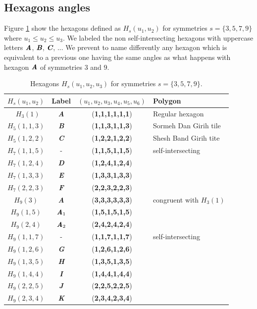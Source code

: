 \documentclass[11pt]{article}
\def\mathbi#1{\textbf{\em #1}}
\begin{document}
\subsection{Hexagons angles}

Figure \ref{tbl:hexagons-angles} show the hexagons defined as $H_s(u_1,u_2)$ for symmetries $s = \{3,5,7,9\}$ where $u_1 \leq u_2 \leq u_3$. We labeled the non self-intersecting hexagons with uppercase letters $\mathbi{A}$, $\mathbi{B}$, $\mathbi{C}$, ... We prevent to name differently any hexagon which is equivalent to a previous one having the same angles as what happens with hexagon $\mathbi{A}$ of symmetries $3$ and $9$.

\begin{table}[H]
\begin{center}
\begin{tabular}{| c | c | c | l | }
\hline
$H_s(u_1,u_2)$ & Label & $(u_1,u_2,u_3,u_4,u_5,u_6)$ & Polygon \\ \hline\
$H_3(1)$   & \mathbi{A} & (\textbf{1,1,1,1,1,1}) & Regular hexagon \\[0.5ex]
\hline
$H_5(1,1,3)$ & \mathbi{B} & (\textbf{1,1,3,1,1,3}) & Sormeh Dan Girih tile\\[0.5ex]
$H_5(1,2,2)$ & \mathbi{C} & (\textbf{1,2,2,1,2,2}) & Shesh Band Girih tite\\[0.5ex]
\hline
$H_7(1,1,5)$ & -          & (\textbf{1,1,5,1,1,5}) & self-intersecting \\[0.5ex]
$H_7(1,2,4)$ & \mathbi{D} & (\textbf{1,2,4,1,2,4}) & \\[0.5ex]
$H_7(1,3,3)$ & \mathbi{E} & (\textbf{1,3,3,1,3,3}) & \\[0.5ex]
$H_7(2,2,3)$ & \mathbi{F} & (\textbf{2,2,3,2,2,3}) & \\[0.5ex]
\hline
$H_9(3)$     & \mathbi{A} & (\textbf{3,3,3,3,3,3}) & congruent with $H_3(1)$\\[0.5ex]
$H_9(1,5)$   & $\mathbi{A}_1$ & (\textbf{1,5,1,5,1,5}) & \\[0.5ex]
$H_9(2,4)$   & $\mathbi{A}_2$ & (\textbf{2,4,2,4,2,4}) & \\[0.5ex]
$H_9(1,1,7)$ & -          & (\textbf{1,1,7,1,1,7}) & self-intersecting \\[0.5ex]
$H_9(1,2,6)$ & \mathbi{G} & (\textbf{1,2,6,1,2,6}) & \\[0.5ex]
$H_9(1,3,5)$ & \mathbi{H} & (\textbf{1,3,5,1,3,5}) & \\[0.5ex]
$H_9(1,4,4)$ & \mathbi{I} & (\textbf{1,4,4,1,4,4}) & \\[0.5ex]
$H_9(2,2,5)$ & \mathbi{J} & (\textbf{2,2,5,2,2,5}) & \\[0.5ex]
$H_9(2,3,4)$ & \mathbi{K} & (\textbf{2,3,4,2,3,4}) & \\[0.5ex]
\hline
\end{tabular}
\caption{Hexagons $H_s(u_1,u_2,u_3)$ for symmetries $s = \{3,5,7,9\}$.} 
\label{tbl:hexagons-angles}
\end{center}
\end{table}
\end{document}
